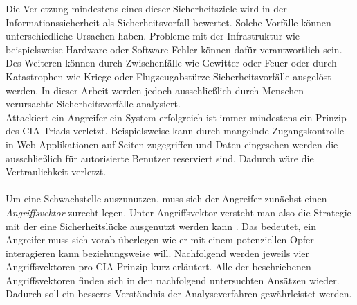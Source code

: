 \documentclass[
    12pt, %
    DIV10,
    ngerman, %
    a4paper, %
    oneside, %
    titlepage, %
    parskip=half, %
    headings=normal, %
    listof=totoc, %
    bibliography=totoc, %
    index=totoc, %
    captions=tableheading, %
    final %
]{scrreprt}
\begin{document}
Die Verletzung mindestens eines dieser Sicherheitsziele wird in der Informationssicherheit als Sicherheitsvorfall bewertet. 
Solche Vorfälle können unterschiedliche Ursachen haben. Probleme mit der Infrastruktur wie beispielsweise Hardware oder Software Fehler können dafür verantwortlich sein. Des Weiteren können durch Zwischenfälle wie Gewitter oder Feuer oder durch Katastrophen wie Kriege oder Flugzeugabstürze Sicherheitsvorfälle ausgelöst werden. In dieser Arbeit werden jedoch ausschlie{\ss}lich durch Menschen verursachte Sicherheitsvorfälle analysiert.\\
Attackiert ein Angreifer ein System erfolgreich ist immer mindestens ein Prinzip des CIA Triads verletzt.
Beispielsweise kann durch mangelnde Zugangskontrolle in Web Applikationen auf Seiten zugegriffen und Daten eingesehen werden die ausschlie{\ss}lich für autorisierte Benutzer reserviert sind. Dadurch wäre die Vertraulichkeit verletzt.\\\\
Um eine Schwachstelle auszunutzen, muss sich der Angreifer zunächst einen \emph{Angriffsvektor} zurecht legen. Unter Angriffsvektor versteht man also die Strategie mit der eine Sicherheitslücke ausgenutzt werden kann \parencite{rahalkar2018network}. Das bedeutet, ein Angreifer muss sich vorab überlegen wie er mit einem potenziellen Opfer interagieren kann beziehungsweise will. 
Nachfolgend werden jeweils vier Angriffsvektoren pro CIA Prinzip kurz erläutert. Alle der beschriebenen Angriffsvektoren finden sich in den nachfolgend untersuchten Ansätzen wieder. Dadurch soll ein besseres Verständnis der Analyseverfahren gewährleistet werden.
\end{document}
